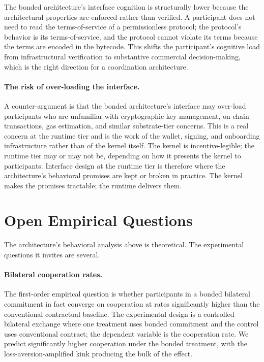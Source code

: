 \documentclass[11pt,a4paper]{article}
\theoremstyle{definition}
\theoremstyle{remark}
\begin{document}
The bonded architecture's interface cognition is structurally
lower because the architectural properties are enforced rather
than verified. A participant does not need to read the
terms-of-service of a permissionless protocol; the protocol's
behavior is its terms-of-service, and the protocol cannot violate
its terms because the terms are encoded in the bytecode. This
shifts the participant's cognitive load from infrastructural
verification to substantive commercial decision-making, which is
the right direction for a coordination architecture.

\paragraph{The risk of over-loading the interface.}
A counter-argument is that the bonded architecture's interface
may over-load participants who are unfamiliar with cryptographic
key management, on-chain transactions, gas estimation, and
similar substrate-tier concerns. This is a real concern at the
runtime tier and is the work of the wallet, signing, and onboarding
infrastructure rather than of the kernel itself. The kernel is
incentive-legible; the runtime tier may or may not be, depending
on how it presents the kernel to participants. Interface design
at the runtime tier is therefore where the architecture's
behavioral promises are kept or broken in practice. The kernel
makes the promises tractable; the runtime delivers them.

\section{Open Empirical Questions}
\label{sec:empirical}

The architecture's behavioral analysis above is theoretical. The
experimental questions it invites are several.

\paragraph{Bilateral cooperation rates.}
The first-order empirical question is whether participants in a
bonded bilateral commitment in fact converge on cooperation at
rates significantly higher than the conventional contractual
baseline. The experimental design is a controlled bilateral
exchange where one treatment uses bonded commitment and the
control uses conventional contract; the dependent variable is
the cooperation rate. We predict significantly higher cooperation
under the bonded treatment, with the loss-aversion-amplified kink
producing the bulk of the effect.
\end{document}
